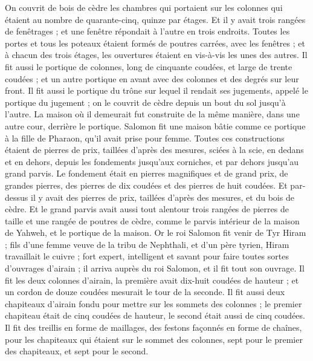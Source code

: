 \begin{multicols}{2}
On couvrit de bois de cèdre les chambres qui portaient sur les colonnes qui étaient au nombre de quarante-cinq, quinze par étages.
Et il y avait trois rangées de fenêtrages ; et une fenêtre répondait à l'autre en trois endroits.
Toutes les portes et tous les poteaux étaient formés de poutres carrées, avec les fenêtres ; et à chacun des trois étages, les ouvertures étaient en vis-à-vis les unes des autres.
Il fit aussi le portique de colonnes, long de cinquante coudées, et large de trente coudées ; et un autre portique en avant avec des colonnes et des degrés sur leur front.
Il fit aussi le portique du trône sur lequel il rendait ses jugements, appelé le portique du jugement ; on le couvrit de cèdre depuis un bout du sol jusqu'à l'autre.
La maison où il demeurait fut construite de la même manière, dans une autre cour, derrière le portique. Salomon fit une maison bâtie comme ce portique à la fille de Pharaon, qu'il avait prise pour femme.
Toutes ces constructions étaient de pierres de prix, taillées d'après des mesures, sciées à la scie, en dedans et en dehors, depuis les fondements jusqu'aux corniches, et par dehors jusqu'au grand parvis.
Le fondement était en pierres magnifiques et de grand prix, de grandes pierres, des pierres de dix coudées et des pierres de huit coudées.
Et par-dessus il y avait des pierres de prix, taillées d'après des mesures, et du bois de cèdre.
Et le grand parvis avait aussi tout alentour trois rangées de pierres de taille et une rangée de poutres de cèdre, comme le parvis intérieur de la maison de Yahweh, et le portique de la maison.
Or le roi Salomon fit venir de Tyr Hiram ;
fils d'une femme veuve de la tribu de Nephthali, et d'un père tyrien, Hiram travaillait le cuivre ; fort expert, intelligent et savant pour faire toutes sortes d'ouvrages d'airain ; il arriva auprès du roi Salomon, et il fit tout son ouvrage.
Il fit les deux colonnes d'airain, la première avait dix-huit coudées de hauteur ; et un cordon de douze coudées mesurait le tour de la seconde.
Il fit aussi deux chapiteaux d'airain fondu pour mettre sur les sommets des colonnes ; le premier chapiteau était de cinq coudées de hauteur, le second était aussi de cinq coudées.
Il fit des treillis en forme de maillages, des festons façonnés en forme de chaînes, pour les chapiteaux qui étaient sur le sommet des colonnes, sept pour le premier des chapiteaux, et sept pour le second.

\end{multicols}
